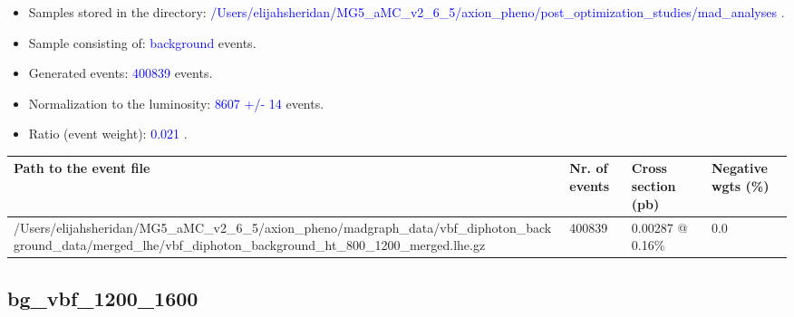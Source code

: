 \documentclass[a4paper, 10pt]{article}
\begin{document}
\begin{itemize}
  \item Samples stored in the directory: \textcolor{blue}{/\-Users/\-elijahsheridan/\-MG5\_aMC\_v2\_6\_5/\-axion\_pheno/\-post\_optimization\_studies/\-mad\_analyses} .
   \item Sample consisting of: \textcolor{blue}{background}  events.
   \item Generated events: \textcolor{blue}{400839 }  events.
   \item Normalization to the luminosity: \textcolor{blue}{8607}\textcolor{blue}{ +/\-- }\textcolor{blue}{14 }  events.
   \item Ratio (event weight): \textcolor{blue}{0.021 } .  
 
\end{itemize}
\begin{table}[H]
  \begin{center}
    \begin{tabular}{|m{55.0mm}|m{25.0mm}|m{30.0mm}|m{30.0mm}|}
      \hline
      {\cellcolor{yellow}         Path to the event file}& {\cellcolor{yellow}         Nr. of events}& {\cellcolor{yellow}         Cross section (pb)}& {\cellcolor{yellow}         Negative wgts (\%)}\\
      \hline
      {\cellcolor{white}          /\-Users/\-elijahsheridan/\-MG5\_aMC\_v2\_6\_5/\-axion\_pheno/\-madgraph\_data/\-vbf\_diphoton\_background\_data/\-merged\_lhe/\-vbf\_diphoton\_background\_ht\_800\_1200\_merged.lhe.gz}& {\cellcolor{white}          400839}& {\cellcolor{white}          0.00287 @ 0.16\%}& {\cellcolor{white}          0.0}\\
\hline
    \end{tabular}
  \end{center}
\end{table}

\subsection{ bg\_vbf\_1200\_1600}
\end{document}
